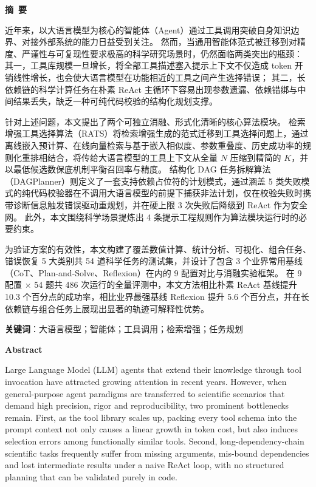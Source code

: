 \cleardoublepage{}
\begin{center}
    \bfseries {} 摘~要
\end{center}

近年来，以大语言模型为核心的智能体（Agent）通过工具调用突破自身知识边界、对接外部系统的能力日益受到关注。
然而，当通用智能体范式被迁移到对精度、严谨性与可复现性要求极高的科学研究场景时，仍然面临两类突出的瓶颈：
其一，工具库规模一旦增长，将全部工具描述塞入提示上下文不仅造成 token 开销线性增长，也会使大语言模型在功能相近的工具之间产生选择错误；
其二，长依赖链的科学计算任务在朴素 ReAct 主循环下容易出现参数遗漏、依赖错绑与中间结果丢失，缺乏一种可纯代码校验的结构化规划支撑。

针对上述问题，本文提出了两个可独立消融、形式化清晰的核心算法模块。
检索增强工具选择算法（RATS）将检索增强生成的范式迁移到工具选择问题上，通过离线嵌入预计算、在线向量检索与基于嵌入相似度、参数重叠度、历史成功率的规则化重排相结合，将传给大语言模型的工具上下文从全量 $N$ 压缩到精简的 $K$，并以最低候选数保底机制平衡召回率与精度。
结构化 DAG 任务拆解算法（DAGPlanner）则定义了一套支持依赖占位符的计划模式，通过涵盖 5 类失败模式的纯代码校验器在不调用大语言模型的前提下捕获非法计划，仅在校验失败时携带诊断信息触发错误驱动重规划，并在硬上限 3 次失败后降级到 ReAct 作为安全网。
此外，本文围绕科学场景提炼出 4 条提示工程规则作为算法模块运行时的必要约束。

为验证方案的有效性，本文构建了覆盖数值计算、统计分析、可视化、组合任务、错误恢复 5 大类别共 54 道科学任务的测试集，并设计了包含 3 个业界常用基线（CoT、Plan-and-Solve、Reflexion）在内的 9 配置对比与消融实验框架。
在 9 配置 $\times$ 54 题共 486 次运行的全量评测中，本文方法相比朴素 ReAct 基线提升 10.3 个百分点的成功率，相比业界最强基线 Reflexion 提升 5.6 个百分点，并在长依赖链与组合任务上展现出显著的轨迹可解释性优势。

\textbf{关键词}：大语言模型；智能体；工具调用；检索增强；任务规划

\cleardoublepage{}
\begin{center}
    \bfseries {} Abstract
\end{center}

Large Language Model (LLM) agents that extend their knowledge through tool invocation have attracted growing attention in recent years.
However, when general-purpose agent paradigms are transferred to scientific scenarios that demand high precision, rigor and reproducibility, two prominent bottlenecks remain.
First, as the tool library scales up, packing every tool schema into the prompt context not only causes a linear growth in token cost, but also induces selection errors among functionally similar tools.
Second, long-dependency-chain scientific tasks frequently suffer from missing arguments, mis-bound dependencies and lost intermediate results under a naive ReAct loop, with no structured planning that can be validated purely in code.

